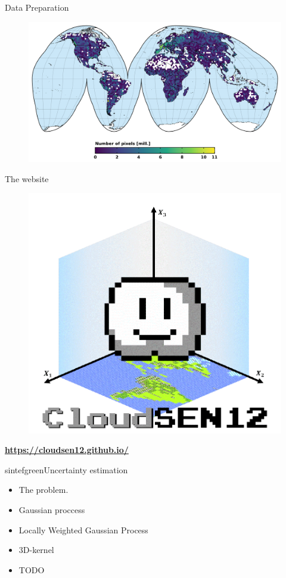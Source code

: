 \documentclass{beamer}
\newcommand{\hrefcol}[2]{\textcolor{cyan}{\href{#1}{#2}}}
\begin{document}
\begin{frame}{Data Preparation}
	\begin{figure}
		\centering
		\includegraphics[width=0.85\linewidth]{images/figure_03}
	\end{figure}
\end{frame}


\begin{frame}{The website}
	\begin{figure}
		\centering
		\includegraphics[width=0.45\linewidth]{images/logo_full.png}
	\end{figure}
	\centering
	\textbf{\hrefcol{https://cloudsen12.github.io/}{https://cloudsen12.github.io/}}
\end{frame}

\begin{chapter}{sintefgreen}{Uncertainty estimation}
	\begin{itemize}
		\item The problem.
		\item Gaussian proccess
		\item Locally Weighted Gaussian Process
		\item 3D-kernel
		\item TODO
	\end{itemize}
\end{chapter}
\end{document}
